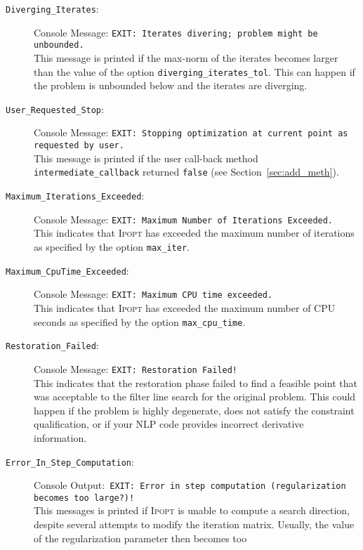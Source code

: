 \documentclass[10pt]{article}
\newcommand{\Ipopt}{\textsc{Ipopt}\xspace}
\begin{document}
\begin{description}
\item[{\tt Diverging\_Iterates}:]  $\;$ \\
  Console Message: {\tt EXIT: Iterates divering; problem might be
    unbounded.} \\
  This message is printed if the max-norm of the iterates becomes
  larger than the value of the option {\tt diverging\_iterates\_tol}.
  This can happen if the problem is unbounded below and the iterates
  are diverging.
\item[{\tt User\_Requested\_Stop}:]  $\;$ \\
  Console Message: {\tt EXIT: Stopping optimization at current point
    as requested by user.} \\
  This message is printed if the user call-back method {\tt
    intermediate\_callback} returned {\tt false} (see
  Section~\ref{sec:add_meth}).
\item[{\tt Maximum\_Iterations\_Exceeded}:]  $\;$ \\
  Console Message: {\tt EXIT: Maximum Number of Iterations Exceeded.} \\
  This indicates that \Ipopt has exceeded the maximum number of
  iterations as specified by the option {\tt max\_iter}.
\item[{\tt Maximum\_CpuTime\_Exceeded}:]  $\;$ \\
  Console Message: {\tt EXIT: Maximum CPU time exceeded.} \\
  This indicates that \Ipopt has exceeded the maximum number of
  CPU seconds as specified by the option {\tt max\_cpu\_time}.
\item[{\tt Restoration\_Failed}:]  $\;$ \\
  Console Message: {\tt EXIT: Restoration Failed!} \\
  This indicates that the restoration phase failed to find a feasible
  point that was acceptable to the filter line search for the original
  problem. This could happen if the problem is highly degenerate, does
  not satisfy the constraint qualification, or if your NLP code
  provides incorrect derivative information.
\item[{\tt Error\_In\_Step\_Computation}:]  $\;$ \\
  Console Output:\ {\tt EXIT:\ Error in step computation (regularization becomes too large?)!} \\
  This messages is printed if \Ipopt is unable to compute a search
  direction, despite several attempts to modify the iteration matrix.
  Usually, the value of the regularization parameter then becomes too

\end{description}
\end{document}
